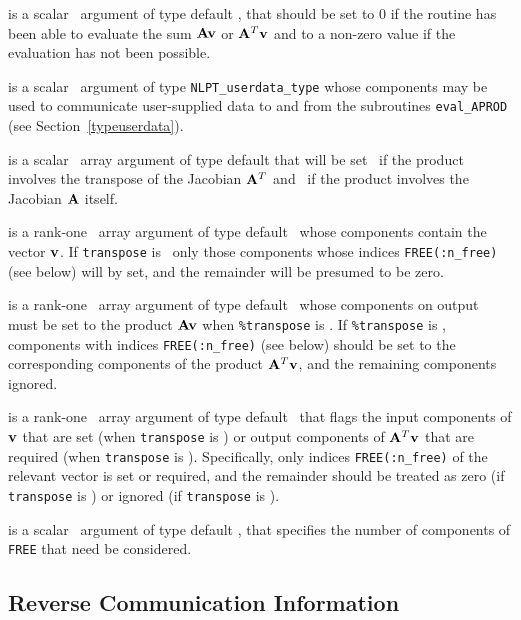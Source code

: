 \documentclass{galahad}
\begin{document}
\begin{description}
 is a scalar \intentout\ argument of type default \integer,
that should be set to 0 if the routine has been able to evaluate the
sum ${\mathbf{A}} {\mathbf{v}}$ or ${\mathbf{A}}^T{\mathbf{v}}$
and to a non-zero value if the evaluation has not been possible.

 is a scalar \intentinout\ argument of type
{\tt NLPT\_userdata\_type} whose components may be used
to communicate user-supplied data to and from the subroutines
{\tt eval\_APROD}
(see Section~\ref{typeuserdata}).

 is a scalar \intentin\ array argument of type
default that will be set \true\ if the product involves the transpose
of the Jacobian ${\mathbf{A}}^T$ and \false\ if the product involves
the Jacobian ${\mathbf{A}}$ itself.

 is a rank-one \intentin\ array argument of type default \realdp\
whose components contain the vector ${\mathbf{v}}$. If {\tt transpose} is \false\
only those components whose indices {\tt FREE(:n\_free)} (see below)
will by set, and the remainder will be presumed to be zero.

 is a rank-one \intentout\ array argument of type default \realdp\
whose components on output must be set to the
product ${\mathbf{A}} {\mathbf{v}}$ when {\tt \%transpose} is \false. If
{\tt \%transpose} is \true, components with indices {\tt FREE(:n\_free)}
(see below) should be set to the corresponding components of the
product ${\mathbf{A}}^T {\mathbf{v}}$, and the remaining components ignored.

\itt{FREE} is a rank-one \intentin\ array argument of
type default \integer\ that flags the input components of ${\mathbf{v}}$ that are set
(when {\tt transpose} is \false) or output components of ${\mathbf{A}}^T {\mathbf{v}}$ that
are required (when {\tt transpose} is \true). Specifically, only indices
{\tt FREE(:n\_free)} of the relevant vector is set or required, and the
remainder should be treated as zero (if {\tt transpose} is \false)
or ignored  (if {\tt transpose} is \true).

\itt{n\_free} is a scalar \intentin\ argument of type default \integer,
that specifies the number of components of {\tt FREE} that need be considered.

\end{description}


\subsection{\label{reverse}Reverse Communication Information}
\end{document}
